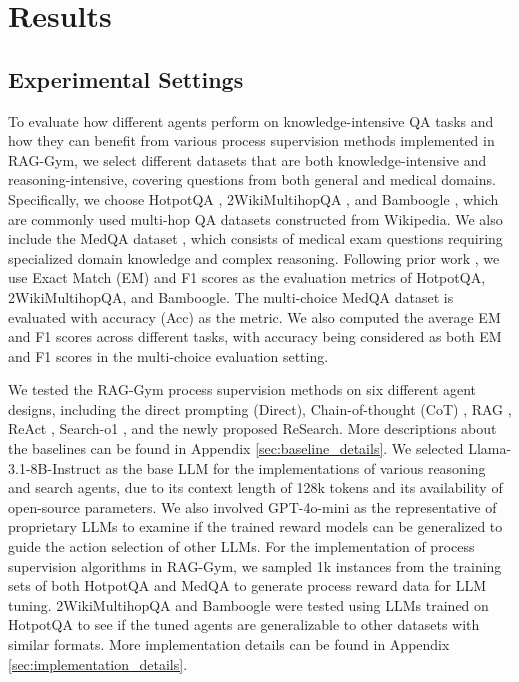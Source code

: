 \section{Results} \label{sec:results}

\subsection{Experimental Settings}

To evaluate how different agents perform on knowledge-intensive QA tasks and how they can benefit from various process supervision methods implemented in RAG-Gym, we select different datasets that are both knowledge-intensive and reasoning-intensive, covering questions from both general and medical domains. Specifically, we choose HotpotQA \citep{yang2018hotpotqa}, 2WikiMultihopQA \citep{ho2020constructing}, and Bamboogle \citep{press2023measuring}, which are commonly used multi-hop QA datasets constructed from Wikipedia. We also include the MedQA dataset \citep{jin2021disease}, which consists of medical exam questions requiring specialized domain knowledge and complex reasoning. Following prior work \citep{shao2023enhancing,xiong2024benchmarking}, we use Exact Match (EM) and F1 scores as the evaluation metrics of HotpotQA, 2WikiMultihopQA, and Bamboogle. The multi-choice MedQA dataset is evaluated with accuracy (Acc) as the metric. We also computed the average EM and F1 scores across different tasks, with accuracy being considered as both EM and F1 scores in the multi-choice evaluation setting.


We tested the RAG-Gym process supervision methods on six different agent designs, including the direct prompting (Direct), Chain-of-thought (CoT) \citep{wei2022chain}, RAG \citep{lewis2020retrieval}, ReAct \citep{yao2023react}, Search-o1 \citep{li2025search}, and the newly proposed ReSearch. More descriptions about the baselines can be found in Appendix \ref{sec:baseline_details}.
We selected Llama-3.1-8B-Instruct \cite{dubey2024llama} as the base LLM for the implementations of various reasoning and search agents, due to its context length of 128k tokens and its availability of open-source parameters. We also involved GPT-4o-mini as the representative of proprietary LLMs to examine if the trained reward models can be generalized to guide the action selection of other LLMs.
For the implementation of process supervision algorithms in RAG-Gym, we sampled 1k instances from the training sets of both HotpotQA and MedQA to generate process reward data for LLM tuning. 2WikiMultihopQA and Bamboogle were tested using LLMs trained on HotpotQA to see if the tuned agents are generalizable to other datasets with similar formats. More implementation details can be found in Appendix \ref{sec:implementation_details}.

